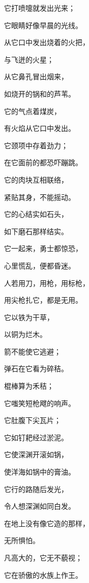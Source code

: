 {\par }{\Q {}它打喷嚏就发出光来；
\par }{\Q 它眼睛好像早晨的光线。
\par }{\Q {}从它口中发出烧着的火把，
\par }{\Q 与飞迸的火星；
\par }{\Q {}从它鼻孔冒出烟来，
\par }{\Q 如烧开的锅和{}的芦苇。
\par }{\Q {}它的气点着煤炭，
\par }{\Q 有火焰从它口中发出。
\par }{\Q {}它颈项中存着劲力；
\par }{\Q 在它面前的都恐吓蹦跳。
\par }{\Q {}它的肉块互相联络，
\par }{\Q 紧贴其身，不能摇动。
\par }{\Q {}它的心结实如石头，
\par }{\Q 如下磨石那样结实。
\par }{\Q {}它一起来，勇士都惊恐，
\par }{\Q 心里慌乱，便都昏迷。
\par }{\Q {}人若用刀，用枪，用标枪，
\par }{\Q 用尖枪扎它，都是无用。
\par }{\Q {}它以铁为干草，
\par }{\Q 以铜为烂木。
\par }{\Q {}箭不能{}使它逃避；
\par }{\Q 弹石在它看为碎秸。
\par }{\Q {}棍棒算为禾秸；
\par }{\Q 它嗤笑短枪飕的响声。
\par }{\Q {}它肚腹下{}尖瓦片；
\par }{\Q 它如钉耙经过淤泥。
\par }{\Q {}它使深渊开滚如锅，
\par }{\Q 使洋海如锅中的膏油。
\par }{\Q {}它行的路随后发光，
\par }{\Q 令人想深渊如同白发。
\par }{\Q {}在地上没有像它造的那样，
\par }{\Q 无所惧怕。
\par }{\Q {}凡高大的，它无不藐视；
\par }{\Q 它在骄傲的水族上作王。

}
